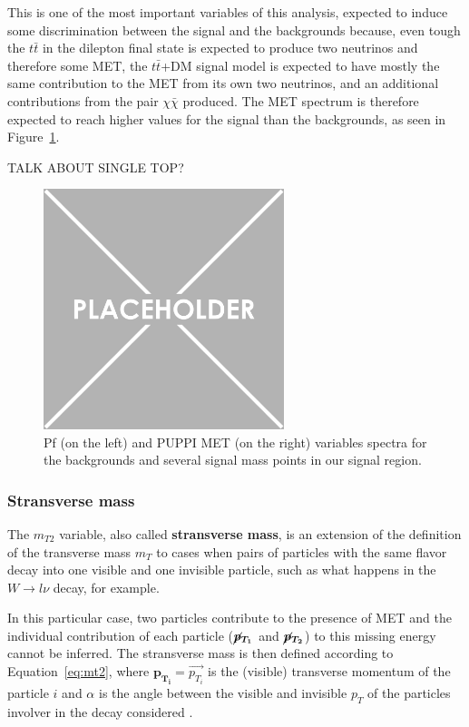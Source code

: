 \documentclass[a4paper, 10pt, openright]{report}
\begin{document}
This is one of the most important variables of this analysis, expected to induce some discrimination between the signal and the backgrounds because, even tough the $t \bar t$ in the dilepton final state is expected to produce two neutrinos and therefore some \ac{MET}, the $t \bar t$+DM signal model is expected to have mostly the same contribution to the \ac{MET} from its own two neutrinos, and an additional contributions from the pair $\chi \bar \chi$ produced. The \ac{MET} spectrum is therefore expected to reach higher values for the signal than the backgrounds, as seen in Figure~\ref{fig:SRdiscMET}.

\color{red} TALK ABOUT SINGLE TOP? \color{black}

\begin{figure}[htbp]
\centering
\includegraphics[width=7cm, height=7cm]{figs/placeholder.png}
\caption{Pf (on the left) and \ac{PUPPI} \ac{MET} (on the right) variables spectra for the backgrounds and several signal mass points in our signal region.}
\label{fig:SRdiscMET}
\end{figure}

\subsubsection*{Stransverse mass}

The $m_{T2}$ variable, also called \textbf{stransverse mass}, is an extension of the definition of the transverse mass $m_T$ to cases when pairs of particles with the same flavor decay into one visible and one invisible particle, such as what happens in the $W \rightarrow l\nu$ decay, for example. 

In this particular case, two particles contribute to the presence of \ac{MET} and the individual contribution of each particle ($\bm{\cancel{p}_{T_{1}}}$ and $\bm{\cancel{p}_{T_2}}$) to this missing energy cannot be inferred. The stransverse mass is then defined according to Equation~\ref{eq:mt2}, where $\bm{p_{T_i}} = \overrightarrow{p_{T_i}}$ is the (visible) transverse momentum of the particle $i$ and $\alpha$ is the angle between the visible and invisible $p_T$ of the particles involver in the decay considered \cite{MT2}.
\end{document}
